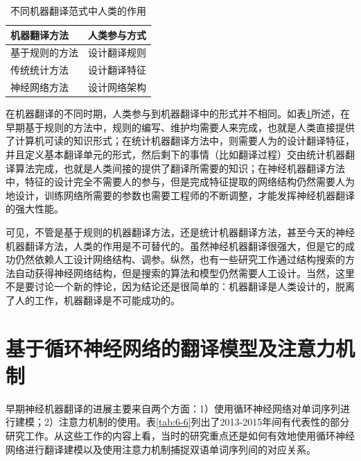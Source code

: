 \begin{table}[htp]
\centering
\caption{不同机器翻译范式中人类的作用}
\label{tab:6-5}
\begin{tabular}{ l | l }
	机器翻译方法			&人类参与方式 \\ \hline
	\rule{0pt}{13pt} 基于规则的方法					&设计翻译规则 \\
	\rule{0pt}{13pt} 传统统计方法					&设计翻译特征 \\
	\rule{0pt}{13pt} 神经网络方法					&设计网络架构 \\
\end{tabular}
\end{table}

\parinterval 在机器翻译的不同时期，人类参与到机器翻译中的形式并不相同。如表\ref{tab:6-5}所述，在早期基于规则的方法中，规则的编写、维护均需要人来完成，也就是人类直接提供了计算机可读的知识形式；在统计机器翻译方法中，则需要人为的设计翻译特征，并且定义基本翻译单元的形式，然后剩下的事情（比如翻译过程）交由统计机器翻译算法完成，也就是人类间接的提供了翻译所需要的知识；在神经机器翻译方法中，特征的设计完全不需要人的参与，但是完成特征提取的网络结构仍然需要人为地设计，训练网络所需要的参数也需要工程师的不断调整，才能发挥神经机器翻译的强大性能。

\parinterval 可见，不管是基于规则的机器翻译方法，还是统计机器翻译方法，甚至今天的神经机器翻译方法，人类的作用是不可替代的。虽然神经机器翻译很强大，但是它的成功仍然依赖人工设计网络结构、调参。纵然，也有一些研究工作通过结构搜索的方法自动获得神经网络结构，但是搜索的算法和模型仍然需要人工设计。当然，这里不是要讨论一个新的悖论，因为结论还是很简单的：机器翻译是人类设计的，脱离了人的工作，机器翻译是不可能成功的。


\sectionnewpage
\section{基于循环神经网络的翻译模型及注意力机制}
\label{sec:6.3}

\parinterval 早期神经机器翻译的进展主要来自两个方面：1）使用循环神经网络对单词序列进行建模；2）注意力机制的使用。表\ref{tab:6-6}列出了2013-2015年间有代表性的部分研究工作。从这些工作的内容上看，当时的研究重点还是如何有效地使用循环神经网络进行翻译建模以及使用注意力机制捕捉双语单词序列间的对应关系。


